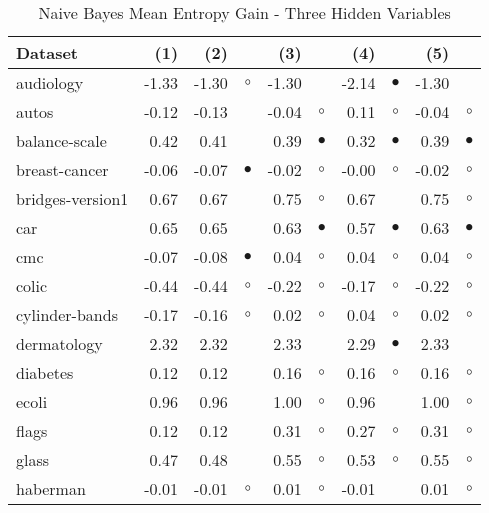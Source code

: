 \newpage
{\centering \footnotesize \begin{longtable}{lrr@{\hspace{0.1cm}}cr@{\hspace{0.1cm}}cr@{\hspace{0.1cm}}cr@{\hspace{0.1cm}}c}
\caption{\label{nbmeg3}Naive Bayes Mean Entropy Gain - Three Hidden Variables}
\\
\hline
Dataset & (1)& (2) & & (3) & & (4) & & (5) & \\
\hline
audiology & -1.33 & -1.30 &    $\circ$ & -1.30 &           & -2.14 & $\bullet$ & -1.30 &          \\
autos & -0.12 & -0.13 &            & -0.04 &   $\circ$ &  0.11 &   $\circ$ & -0.04 &   $\circ$\\
balance-scale &  0.42 &  0.41 &            &  0.39 & $\bullet$ &  0.32 & $\bullet$ &  0.39 & $\bullet$\\
breast-cancer & -0.06 & -0.07 &  $\bullet$ & -0.02 &   $\circ$ & -0.00 &   $\circ$ & -0.02 &   $\circ$\\
bridges-version1 &  0.67 &  0.67 &            &  0.75 &   $\circ$ &  0.67 &           &  0.75 &   $\circ$\\
car &  0.65 &  0.65 &            &  0.63 & $\bullet$ &  0.57 & $\bullet$ &  0.63 & $\bullet$\\
cmc & -0.07 & -0.08 &  $\bullet$ &  0.04 &   $\circ$ &  0.04 &   $\circ$ &  0.04 &   $\circ$\\
colic & -0.44 & -0.44 &    $\circ$ & -0.22 &   $\circ$ & -0.17 &   $\circ$ & -0.22 &   $\circ$\\
cylinder-bands & -0.17 & -0.16 &    $\circ$ &  0.02 &   $\circ$ &  0.04 &   $\circ$ &  0.02 &   $\circ$\\
dermatology &  2.32 &  2.32 &            &  2.33 &           &  2.29 & $\bullet$ &  2.33 &          \\
diabetes &  0.12 &  0.12 &            &  0.16 &   $\circ$ &  0.16 &   $\circ$ &  0.16 &   $\circ$\\
ecoli &  0.96 &  0.96 &            &  1.00 &   $\circ$ &  0.96 &           &  1.00 &   $\circ$\\
flags &  0.12 &  0.12 &            &  0.31 &   $\circ$ &  0.27 &   $\circ$ &  0.31 &   $\circ$\\
glass &  0.47 &  0.48 &            &  0.55 &   $\circ$ &  0.53 &   $\circ$ &  0.55 &   $\circ$\\
haberman & -0.01 & -0.01 &    $\circ$ &  0.01 &   $\circ$ & -0.01 &           &  0.01 &   $\circ$\\

\end{longtable}}
